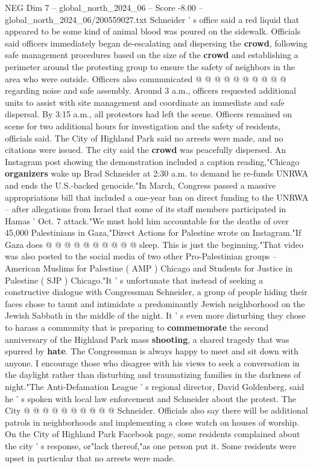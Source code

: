 \begin{textsample}{NEG Dim 7 – global\_north\_2024\_06 – Score -8.00 – global\_north\_2024\_06/200559027.txt}
Schneider ' s office said a red liquid that appeared to be some kind of animal blood was poured on the sidewalk.
Officials said officers immediately began de-escalating and dispersing the \textbf{crowd}, following safe management procedures based on the size of the \textbf{crowd} and establishing a perimeter around the protesting group to ensure the safety of neighbors in the area who were outside.
Officers also communicated @ @ @ @ @ @ @ @ @ @ regarding noise and safe assembly.
Around 3 a.m., officers requested additional units to assist with site management and coordinate an immediate and safe dispersal.
By 3:15 a.m., all protestors had left the scene.
Officers remained on scene for two additional hours for investigation and the safety of residents, officials said.
The City of Highland Park said no arrests were made, and no citations were issued.
The city said the \textbf{crowd} was peacefully dispersed.
An Instagram post showing the demonstration included a caption reading,"Chicago \textbf{organizers} wake up Brad Schneider at 2:30 a.m. to demand he re-funds UNRWA and ends the U.S.-backed genocide."In March, Congress passed a massive appropriations bill that included a one-year ban on direct funding to the UNRWA -- after allegations from Israel that some of its staff members participated in Hamas ' Oct. 7 attack."We must hold him accountable for the deaths of over 45,000 Palestinians in Gaza,"Direct Actions for Palestine wrote on Instagram."If Gaza does @ @ @ @ @ @ @ @ @ @ sleep.
This is just the beginning."That video was also posted to the social media of two other Pro-Palestinian groups -- American Muslims for Palestine ( AMP ) Chicago and Students for Justice in Palestine ( SJP ) Chicago."It ' s unfortunate that instead of seeking a constructive dialogue with Congressman Schneider, a group of people hiding their faces chose to taunt and intimidate a predominantly Jewish neighborhood on the Jewish Sabbath in the middle of the night.
It ' s even more disturbing they chose to harass a community that is preparing to \textbf{commemorate} the second anniversary of the Highland Park mass \textbf{shooting}, a shared tragedy that was spurred by \textbf{hate}.
The Congressman is always happy to meet and sit down with anyone.
I encourage those who disagree with his views to seek a conversation in the daylight rather than disturbing and traumatizing families in the darkness of night."The Anti-Defamation League ' s regional director, David Goldenberg, said he ' s spoken with local law enforcement and Schneider about the protest.
The City @ @ @ @ @ @ @ @ @ @ Schneider.
Officials also say there will be additional patrols in neighborhoods and implementing a close watch on houses of worship.
On the City of Highland Park Facebook page, some residents complained about the city ' s response, or"lack thereof,"as one person put it.
Some residents were upset in particular that no arrests were made.

\end{textsample}
